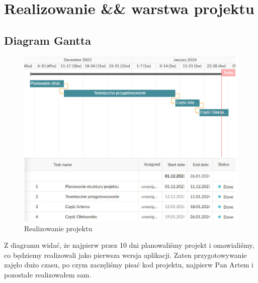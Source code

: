 ﻿%
\chapter{Realizowanie \&\& warstwa projektu}
\section{Diagram Gantta}
\begin{figure}[!ht]
	\centering
		\includegraphics[width=16cm]{gantt.jpg}
  \caption{\footnotesize Realizowanie projektu}
	\label{fig:plotend}
\end{figure}
Z diagramu widać, że najpierw przez 10 dni planowaliśmy projekt i omawialiśmy, co będziemy realizowali jako pierwsza wersja aplikacji. Zaten przygotowywanie zajęło dużo czasu, po czym zaczęliśmy pisać kod projektu, najpierw Pan Artem i pozostałe realizowałem sam.
\newpage
